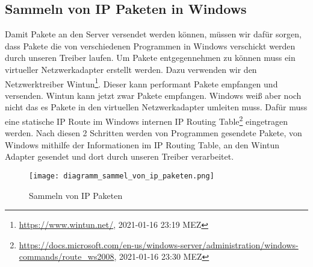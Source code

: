 \subsection{Sammeln von IP Paketen in Windows}
Damit Pakete an den Server versendet werden können, müssen wir dafür sorgen, dass Pakete die von verschiedenen Programmen in Windows verschickt werden durch unseren Treiber laufen. Um Pakete entgegennehmen zu können muss ein virtueller Netzwerkadapter erstellt werden. Dazu verwenden wir den Netzwerktreiber Wintun\footnote[1]{\url{https://www.wintun.net/}, 2021-01-16 23:19 MEZ}. Dieser kann performant Pakete empfangen und versenden.
\newline
\newline
Wintun kann jetzt zwar Pakete empfangen. Windows weiß aber noch nicht das es Pakete in den virtuellen Netzwerkadapter umleiten muss. Dafür muss eine statische IP Route im Windows internen IP Routing Table\footnote[2]{\url{https://docs.microsoft.com/en-us/windows-server/administration/windows-commands/route_ws2008}, 2021-01-16 23:30 MEZ} eingetragen werden.
\newline
\newline
Nach diesen 2 Schritten werden von Programmen gesendete Pakete, von Windows mithilfe  der Informationen im IP Routing Table, an den Wintun Adapter gesendet und dort durch unseren Treiber verarbeitet.
\begin{figure}[H]
    \centering
    \texttt{[image: diagramm\_sammel\_von\_ip\_paketen.png]}
    \caption[Sammeln von IP Paketen]{Sammeln von IP Paketen } 
\end{figure}
\newpage
